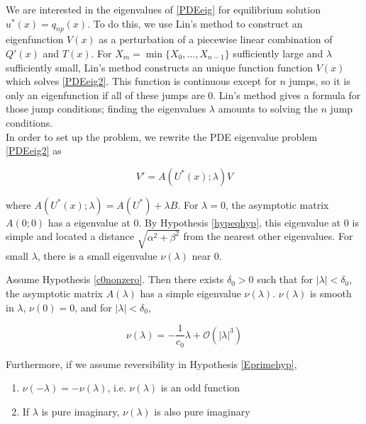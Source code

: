 \documentclass[thesis.tex]{subfiles}
\begin{document}
We are interested in the eigenvalues of \eqref{PDEeig} for equilibrium solution $u^*(x) = q_{np}(x)$. To do this, we use Lin's method to construct an eigenfunction $V(x)$ as a perturbation of a piecewise linear combination of $Q'(x)$ and $T(x)$. For $X_m = \min\{X_0, \dots, X_{n-1} \}$ sufficiently large and $\lambda$ sufficiently small, Lin's method constructs an unique function function $V(x)$ which solves \eqref{PDEeig2}. This function is continuous except for $n$ jumps, so it is only an eigenfunction if all of these jumps are 0. Lin's method gives a formula for those jump conditions; finding the eigenvalues $\lambda$ amounts to solving the $n$ jump conditions.\\

In order to set up the problem, we rewrite the PDE eigenvalue problem \eqref{PDEeig2} as

\begin{equation}\label{PDEeig3}
V' = A(U^*(x); \lambda)V 
\end{equation} 

where $A(U^*(x); \lambda) = A(U^*) + \lambda B$. For $\lambda = 0$, the asymptotic matrix $A(0; 0)$ has a eigenvalue at 0. By Hypothesis \ref{hypeqhyp}, this eigenvalue at 0 is simple and located a distance $\sqrt{\alpha^2 + \beta^2}$ from the nearest other eigenvalues. For small $\lambda$, there is a small eigenvalue $\nu(\lambda)$ near 0.


\begin{lemma}\label{nulambdalemma}
Assume Hypothesis \ref{c0nonzero}. Then there exists $\delta_0 > 0$ such that for $|\lambda| < \delta_0$, the asymptotic matrix $A(\lambda)$ has a simple eigenvalue $\nu(\lambda)$. $\nu(\lambda)$ is smooth in $\lambda$, $\nu(0) = 0$, and for $|\lambda| < \delta_0$,

\begin{equation}\label{nulambda}
\nu(\lambda) = -\frac{1}{c_0} \lambda + \mathcal{O}(|\lambda|^3)
\end{equation}

Furthermore, if we assume reversibility in Hypothesis \ref{Eprimehyp},

\begin{enumerate}
\item $\nu(-\lambda) = -\nu(\lambda)$, i.e. $\nu(\lambda)$ is an odd function 
\item If $\lambda$ is pure imaginary, $\nu(\lambda)$ is also pure imaginary
\end{enumerate}

\end{lemma}
\end{document}

